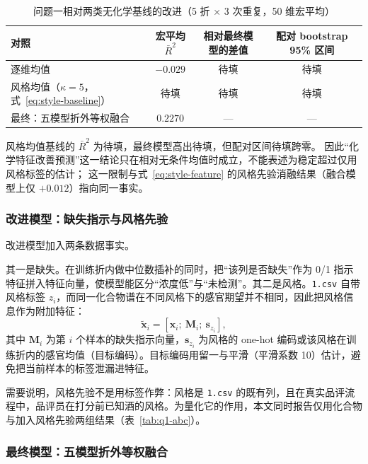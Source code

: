 ﻿\documentclass[UTF8,a4paper,zihao=-4]{ctexart}
\numberwithin{figure}{section}
\numberwithin{table}{section}
\numberwithin{equation}{section}
\newcommand{\file}[1]{\texttt{#1}}
\newcommand{\vx}{\bm{x}}
\newcommand{\bM}{\bm{M}}
\begin{document}
\begin{table}[H]
  \centering
  \caption{问题一相对两类无化学基线的改进（5 折 × 3 次重复，50 维宏平均）}
  \label{tab:q1-stylebase}
  \small
  \begin{tabularx}{\textwidth}{@{}>{\raggedright\arraybackslash}X c c c@{}}
    \toprule
    对照 & 宏平均 $\bar R^2$ & 相对最终模型的差值 & 配对 bootstrap 95\% 区间 \\
    \midrule
    逐维均值 & $-0.029$ & 待填 & 待填 \\
    风格均值（$\kappa=5$，式~\eqref{eq:style-baseline}） & 待填 & 待填 & 待填 \\
    最终：五模型折外等权融合 & $0.2270$ & — & — \\
    \bottomrule
  \end{tabularx}
\end{table}

风格均值基线的 $\bar R^2$ 为待填，最终模型高出待填，但配对区间待填跨零。
因此“化学特征改善预测”这一结论只在相对无条件均值时成立，不能表述为稳定超过仅用风格标签的估计；
这一限制与式~\eqref{eq:style-feature} 的风格先验消融结果（融合模型上仅 $+0.012$）指向同一事实。

\subsubsection{改进模型：缺失指示与风格先验}

改进模型加入两条数据事实。

其一是缺失。在训练折内做中位数插补的同时，把“该列是否缺失”作为 0/1 指示特征拼入特征向量，使模型能区分“浓度低”与“未检测”。其二是风格。\file{1.csv} 自带风格标签 $z_i$，而同一化合物谱在不同风格下的感官期望并不相同，因此把风格信息作为附加特征：
\begin{equation}
\tilde{\vx}_i=\left[\vx_i;\ \bM_i;\ \bm{s}_{z_i}\right],
\label{eq:style-feature}
\end{equation}
其中 $\bM_i$ 为第 $i$ 个样本的缺失指示向量，$\bm{s}_{z_i}$ 为风格的 one-hot 编码或该风格在训练折内的感官均值（目标编码）。目标编码用留一与平滑（平滑系数 10）估计，避免把当前样本的标签泄漏进特征。

需要说明，风格先验不是用标签作弊：风格是 \file{1.csv} 的既有列，且在真实品评流程中，品评员在打分前已知酒的风格。为量化它的作用，本文同时报告仅用化合物与加入风格先验两组结果（表~\ref{tab:q1-abc}）。

\subsubsection{最终模型：五模型折外等权融合}
\end{document}
